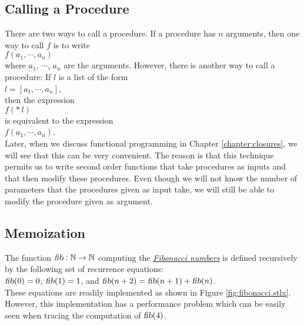 \subsection{Calling a Procedure}
There are two ways to call a procedure.  If a procedure has $n$ arguments, then one way to call $f$ is
to write
\\[0.2cm]
\hspace*{1.3cm}
$f(a_1, \cdots, a_n)$
\\[0.2cm]
where $a_1$, $\cdots$, $a_n$ are the arguments.  However, there is another way to call a procedure:
If $l$ is a list of the form
\\[0.2cm]
\hspace*{1.3cm}
$l = [a_1, \cdots, a_n]$,
\\[0.2cm]
then the expression
\\[0.2cm]
\hspace*{1.3cm}
$f(\mathtt{*}\,l)$
\\[0.2cm]
is equivalent to the expression
\\[0.2cm]
\hspace*{1.3cm}
$f(a_1, \cdots, a_n)$.
\\[0.2cm]
Later, when we discuss functional programming in Chapter \ref{chapter:closures}, we will see that
this can be very convenient.  The reason is that this technique permits us to write second order functions
that take procedures as inputs and that then modify these procedures.  Even though we will not know the number
of parameters that the procedures given as input take, we will still be able to modify the procedure
given as argument.

\subsection{Memoization}
The function $\textsl{fib}: \mathbb{N} \rightarrow
\mathbb{N}$ computing the
\href{http://en.wikipedia.org/wiki/Fibonacci_numbers}{\emph{Fibonacci numbers}}
is defined recursively by the following set of recurrence equations:
\\[0.2cm]
\hspace*{1.3cm}
$\textsl{fib}(0) = 0$, \quad
$\textsl{fib}(1) = 1$, \quad and \quad
$\textsl{fib}(n+2) = \textsl{fib}(n+1) + \textsl{fib}(n)$. 
\\[0.2cm]
These equations are readily implemented as shown in Figure \ref{fig:fibonacci.stlx}.
However, this implementation has a performance problem which can be easily seen when tracing the
computation of $\textsl{fib}(4)$.  


